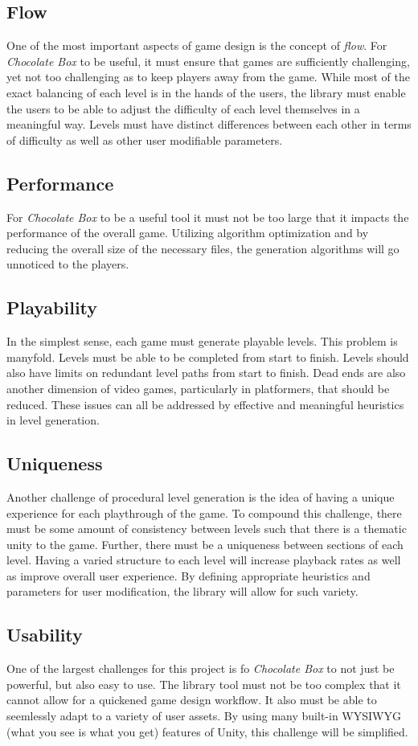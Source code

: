 \documentclass[pdftex,12pt,letter]{article}
\begin{document}
\begin{itemize}
\begin{itemize}
\begin{itemize}
\subsection{Flow}
One of the most important aspects of game design is the concept of \textit{flow}.  For \textit{Chocolate Box} to be useful, it must ensure that games are sufficiently challenging, yet not too challenging as to keep players away from the game. While most of the  exact balancing of each level is in the hands of the users, the library must enable the users to be able to adjust the difficulty of each level themselves in a meaningful way. Levels must have distinct differences between each other in terms of difficulty as well as other user modifiable parameters. 
\subsection{Performance}
For \textit{Chocolate Box} to be a useful tool it must not be too large that it impacts the performance of the overall game. Utilizing algorithm optimization and by reducing the overall size of the necessary files, the generation algorithms will go unnoticed to the players. 
\subsection{Playability}
In the simplest sense, each game must generate playable levels. This problem is manyfold. Levels must be able to be completed from start to finish. Levels should also have limits on redundant level paths from start to finish. Dead ends are also another dimension of video games, particularly in platformers, that should be reduced. These issues can all be addressed by effective and meaningful heuristics in level generation.
\subsection{Uniqueness}
Another challenge of procedural level generation is the idea of having a unique experience for each playthrough of the game. To compound this challenge, there must be some amount of consistency between levels such that there is a thematic unity to the game. Further, there must be a uniqueness between sections of each level. Having a varied structure to each level will increase playback rates as well as improve overall user experience. By defining appropriate heuristics and parameters for user modification, the library will allow for such variety. 
\subsection{Usability}
One of the largest challenges for this project is fo \textit{Chocolate Box} to not just be powerful, but also easy to use. The library tool must not be too complex that it cannot allow for a quickened game design workflow. It also must be able to seemlessly adapt to a variety of user assets. By using many built-in WYSIWYG (what you see is what you get) features of Unity, this challenge will be simplified. 

\end{itemize}
\end{itemize}
\end{itemize}
\end{document}

